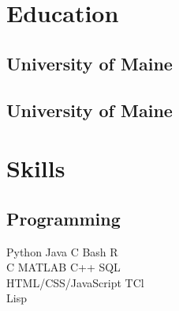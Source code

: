 \documentclass[letterpaper]{deedy-resume} %
\begin{document}
\begin{minipage}[t]{0.33\textwidth} %


\section{Education} 

    \subsection{University of Maine}

    \sectionspace

    \subsection{University of Maine}


        \sectionspace %


\section{Skills}

    \subsection{Programming}

        \textbullet{} Python \textbullet{} Java \textbullet{} C \textbullet{} Bash \textbullet{} R \\
        \textbullet{} C \textbullet{} MATLAB \textbullet{} C++ \textbullet{} SQL \\ 
        \textbullet{} HTML/CSS/JavaScript \textbullet{} TCl \\
        \textbullet{} Lisp  
        \sectionspace


\end{minipage}
\end{document}
